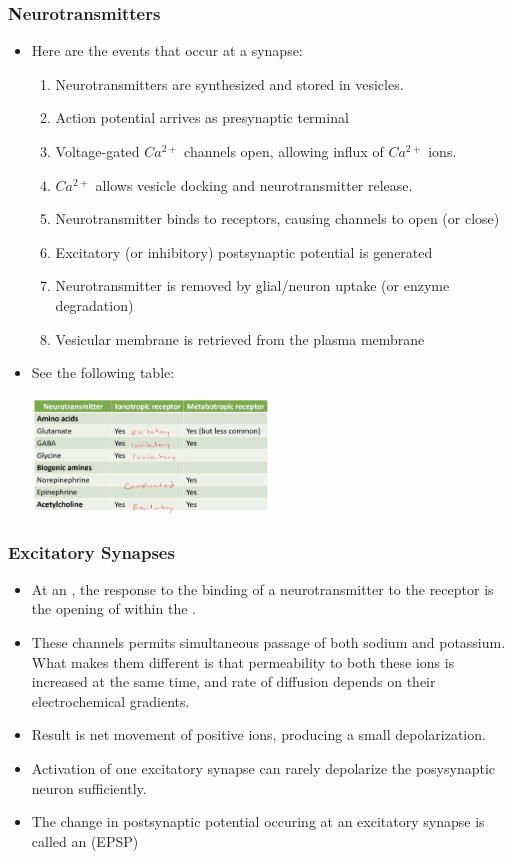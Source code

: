 \documentclass{article}
\numberwithin{equation}{section}
\begin{document}
\subsubsection{Neurotransmitters}
\begin{itemize}
    \item Here are the events that occur at a synapse:
    \begin{enumerate}
        \item Neurotransmitters are synthesized and stored in vesicles.
        \item Action potential arrives as presynaptic terminal
        \item Voltage-gated $Ca^{2+}$ channels open, allowing influx of $Ca^{2+}$ ions.
        \item $Ca^{2+}$ allows vesicle docking and neurotransmitter release.
        \item Neurotransmitter binds to receptors, causing channels to open (or close)
        \item Excitatory (or inhibitory) postsynaptic potential is generated 
        \item Neurotransmitter is removed by glial/neuron uptake (or enzyme degradation)
        \item Vesicular membrane is retrieved from the plasma membrane
    \end{enumerate}
    \item See the following table:
    \begin{center}
        \includegraphics[width=0.5\textwidth]{figures/neurotransmitters.png}
    \end{center}
\end{itemize}
\subsubsection{Excitatory Synapses}
\begin{itemize}
    \item At an , the response to the binding of a neurotransmitter to the receptor is the opening of  within the .
    \item These channels permits simultaneous passage of both sodium and potassium. What makes them different is that permeability to both these ions is increased at the same time, and rate of diffusion depends on their electrochemical gradients.
    \item Result is net movement of positive ions, producing a small depolarization.
    \item Activation of one excitatory synapse can rarely depolarize the posysynaptic neuron sufficiently.
    \item The change in postsynaptic potential occuring at an excitatory synapse is called an  (EPSP)
\end{itemize}
\end{document}
